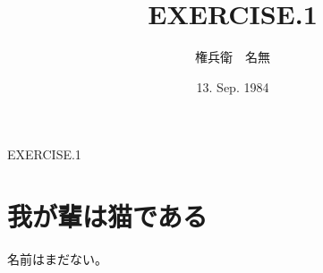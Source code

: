\documentclass{jsarticle}
\begin{document}
\title{EXERCISE.1}
\author{権兵衛　名無}
\date{13. Sep. 1984}
\maketitle

\begin{center}
{\Huge EXERCISE.1}
\end{center}

\section{我が輩は猫である}
名前はまだない。

\end{document}

